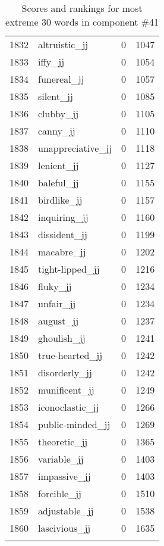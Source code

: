 \begin{longtable}[!htbp]{| rlr@{.}l |}
    1832 & altruistic\_jj & 0 & 1047 \\
    1833 & iffy\_jj & 0 & 1054 \\
    1834 & funereal\_jj & 0 & 1057 \\
    1835 & silent\_jj & 0 & 1085 \\
    1836 & clubby\_jj & 0 & 1105 \\
    1837 & canny\_jj & 0 & 1110 \\
    1838 & unappreciative\_jj & 0 & 1118 \\
    1839 & lenient\_jj & 0 & 1127 \\
    1840 & baleful\_jj & 0 & 1155 \\
    1841 & birdlike\_jj & 0 & 1157 \\
    1842 & inquiring\_jj & 0 & 1160 \\
    1843 & dissident\_jj & 0 & 1199 \\
    1844 & macabre\_jj & 0 & 1202 \\
    1845 & tight-lipped\_jj & 0 & 1216 \\
    1846 & fluky\_jj & 0 & 1234 \\
    1847 & unfair\_jj & 0 & 1234 \\
    1848 & august\_jj & 0 & 1237 \\
    1849 & ghoulish\_jj & 0 & 1241 \\
    1850 & true-hearted\_jj & 0 & 1242 \\
    1851 & disorderly\_jj & 0 & 1242 \\
    1852 & munificent\_jj & 0 & 1249 \\
    1853 & iconoclastic\_jj & 0 & 1266 \\
    1854 & public-minded\_jj & 0 & 1269 \\
    1855 & theoretic\_jj & 0 & 1365 \\
    1856 & variable\_jj & 0 & 1403 \\
    1857 & impassive\_jj & 0 & 1403 \\
    1858 & forcible\_jj & 0 & 1510 \\
    1859 & adjustable\_jj & 0 & 1538 \\
    1860 & lascivious\_jj & 0 & 1635 \\
    \hline
    \caption{Scores and rankings for most extreme 30 words in component \#41} \\
\end{longtable}
